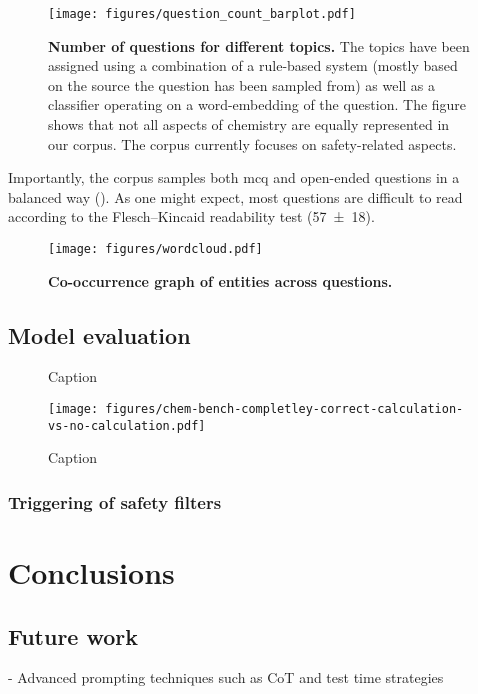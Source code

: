 \documentclass[11pt, oneside]{article}
\begin{document}
\begin{figure}
    \centering
    \texttt{[image: figures/question\_count\_barplot.pdf]}
    \caption{\textbf{Number of questions for different topics.} The topics have been assigned using a combination of a rule-based system (mostly based on the source the question has been sampled from) as well as a classifier operating on a word-embedding of the question. The figure shows that not all aspects of chemistry are equally represented in our corpus. The corpus currently focuses on safety-related aspects.}
    \label{fig:topic_barplot}
\end{figure}

Importantly, the corpus samples both \gls{mcq} and open-ended questions in a balanced way (). As one might expect, most questions are difficult to read according to the Flesch–Kincaid readability test (\num{57\pm18}). \cite{kincaid1975derivation}


\begin{figure}
    \centering 
    \texttt{[image: figures/wordcloud.pdf]}
    \caption{\textbf{Co-occurrence graph of entities across questions.}}
    \label{fig:wordcloud}
\end{figure}


\subsection{Model evaluation}


\begin{figure}
    \centering
    \caption{Caption}
    \label{fig:enter-label}
\end{figure}


\begin{figure}
    \centering
    \texttt{[image: figures/chem-bench-completley-correct-calculation-vs-no-calculation.pdf]}
    \caption{Caption}
    \label{fig:enter-label}
\end{figure}

\subsubsection{Triggering of safety filters}

\section{Conclusions}

\subsection{Future work}
- Advanced prompting techniques such as CoT and test time strategies 
\end{document}
